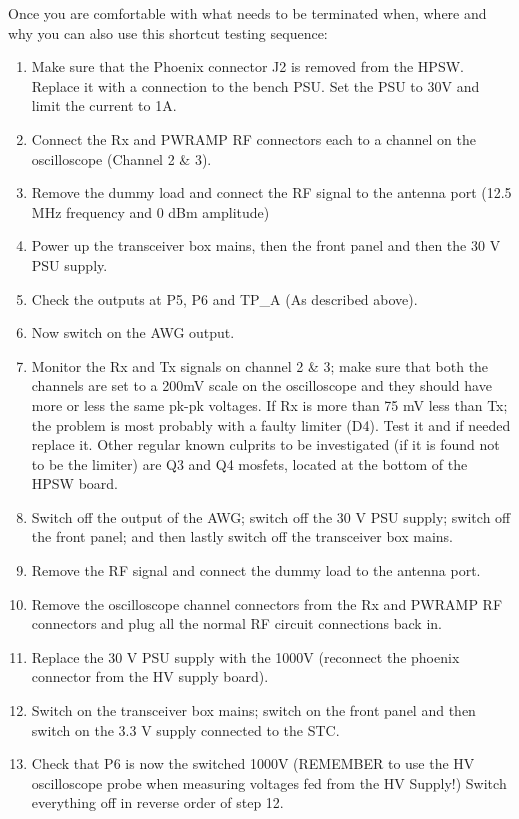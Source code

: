 Once you are comfortable with what needs to be terminated when, where and why you can also use this shortcut testing sequence:
\begin{enumerate}
	\item Make sure that the Phoenix connector J2 is removed from the HPSW. Replace it with a connection to the bench PSU. Set the PSU to 30V and limit the current to 1A.
	\item Connect the Rx and PWRAMP RF connectors each to a channel on the oscilloscope (Channel 2 \& 3).
	\item Remove the dummy load and connect the RF signal to the antenna port (12.5 MHz frequency and 0 dBm amplitude)
	\item Power up the transceiver box mains, then the front panel and then the 30 V PSU supply.
	\item Check the outputs at P5, P6 and TP\_A (As described above).
	\item Now switch on the AWG output.
	\item Monitor the Rx and Tx signals on channel 2 \& 3; make sure that both the channels are set to a 200mV scale on the oscilloscope and they should have more or less the same pk-pk voltages. If Rx is more than 75 mV less than Tx; the problem is most probably with a faulty limiter (D4). Test it and if needed replace it. Other regular known culprits to be investigated (if it is found not to be the limiter) are Q3 and Q4 mosfets, located at the bottom of the HPSW board.
	\item Switch off the output of the AWG; switch off the 30 V PSU supply; switch off the front panel; and then lastly switch off the transceiver box mains.
	\item Remove the RF signal and connect the dummy load to the antenna port.
	\item Remove the oscilloscope channel connectors from the Rx and PWRAMP RF connectors and plug all the normal RF circuit connections back in.
	\item Replace the 30 V PSU supply with the 1000V (reconnect the phoenix connector from the HV supply board).
	\item Switch on the transceiver box mains; switch on the front panel and then switch on the 3.3 V supply connected to the STC.
	\item Check that P6 is now the switched 1000V (REMEMBER to use the HV oscilloscope probe when measuring voltages fed from the HV Supply!) Switch everything off in reverse order of step 12.
\end{enumerate}

